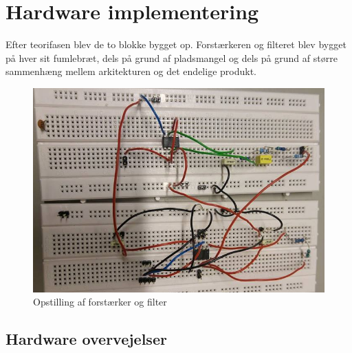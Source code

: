 \section{Hardware implementering}\label{Hardware implementering}

Efter teorifasen blev de to blokke bygget op. Forstærkeren og filteret blev bygget på hver sit fumlebræt, dels på grund af pladsmangel og dels på grund af større sammenhæng mellem arkitekturen og det endelige produkt.\\

\begin{figure}[H]
	\centering
	\includegraphics[width=1\textwidth]{Figurer/Hardware/samletopstilling}
	\caption{Opstilling af forstærker og filter}
	\label{Dsamletopbygning}
\end{figure}

\subsection{Hardware overvejelser}

